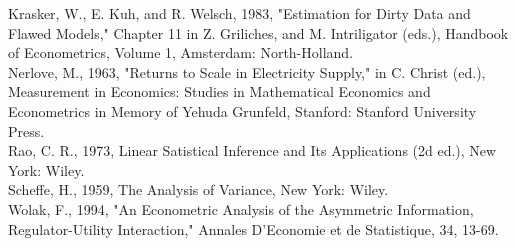 \documentclass[10pt]{article}
\begin{document}
Krasker, W., E. Kuh, and R. Welsch, 1983, "Estimation for Dirty Data and Flawed Models," Chapter 11 in Z. Griliches, and M. Intriligator (eds.), Handbook of Econometrics, Volume 1, Amsterdam: North-Holland.\\
Nerlove, M., 1963, "Returns to Scale in Electricity Supply," in C. Christ (ed.), Measurement in Economics: Studies in Mathematical Economics and Econometrics in Memory of Yehuda Grunfeld, Stanford: Stanford University Press.\\
Rao, C. R., 1973, Linear Satistical Inference and Its Applications (2d ed.), New York: Wiley.\\
Scheffe, H., 1959, The Analysis of Variance, New York: Wiley.\\
Wolak, F., 1994, "An Econometric Analysis of the Asymmetric Information, Regulator-Utility Interaction," Annales D'Economie et de Statistique, 34, 13-69.
\end{document}
